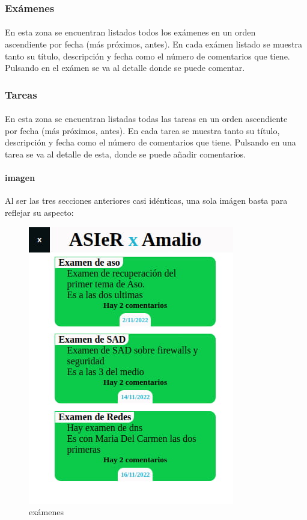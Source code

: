 \documentclass[a4paper]{article}
\begin{document}
\subsubsection[/app/curso/examenes]{Exámenes}
\paragraph{}
En esta zona se encuentran listados todos los exámenes en un orden\\ ascendiente por fecha 
(más próximos, antes). En cada exámen listado se muestra tanto su título, descripción y 
fecha como el número de comentarios que tiene. Pulsando en el exámen se va al detalle 
donde se puede comentar.
\subsubsection[/app/curso/tareas]{Tareas}
\paragraph{}
En esta zona se encuentran listadas todas las tareas en un orden ascendiente\\ por fecha 
(más próximos, antes). En cada tarea se muestra tanto su título, descripción y 
fecha como el número de comentarios que tiene. Pulsando en una tarea se va al detalle 
de esta, donde se puede añadir comentarios.
\paragraph{imagen}
Al ser las tres secciones anteriores casi idénticas,  una sola imágen basta para reflejar su aspecto:
\begin{figure}[ht]
   \includegraphics[scale=0.5]{./assets/examenes.jpg}
   \centering
   \caption{exámenes}
   \label{fig:examenes}
\end{figure}
\newpage
\end{document}
